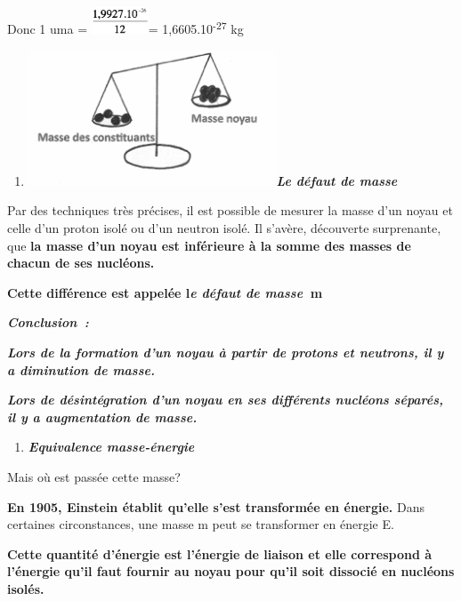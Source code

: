 Donc 1 uma =
\includegraphics[width=1.694cm,height=0.8cm]{Pictures/100000010000005000000026311100B7BB4DB460.png}=
1,6605.10\textsuperscript{-27} kg

\begin{enumerate}
\def\labelenumi{\alph{enumi})}
\tightlist
\item
  \includegraphics[width=7.375cm,height=4.023cm]{Pictures/100000010000011D0000009C9371CDD98EE4E2B1.png}\emph{\textbf{Le
  défaut de masse }}
\end{enumerate}

Par des techniques très précises, il est possible de mesurer la masse
d'un noyau et celle d'un proton isolé ou d'un neutron isolé. Il s'avère,
découverte surprenante, que \textbf{la masse d'un noyau est inférieure à
la somme des masses de chacun de ses nucléons. ~}

\textbf{Cette différence est appelée l}\emph{\textbf{e défaut de
masse}}\textbf{ m}

\emph{\textbf{Conclusion~:}}

\emph{\textbf{Lors de la formation d'un noyau à partir de protons et
neutrons, il y a diminution de masse.}}

\emph{\textbf{Lors de désintégration d'un noyau en ses différents
nucléons séparés, il y a augmentation de masse. }}

\begin{enumerate}
\def\labelenumi{\alph{enumi})}
\tightlist
\item
  \emph{\textbf{Equivalence masse-énergie}}
\end{enumerate}

Mais où est passée cette masse?

\textbf{En 1905, Einstein établit qu'elle s'est transformée en énergie.}
Dans certaines circonstances, une masse m peut se transformer en énergie
E.

\textbf{Cette quantité d'énergie est l'énergie de liaison et elle
correspond à l'énergie qu'il faut fournir au noyau pour qu'il soit
dissocié en nucléons isolés.}


